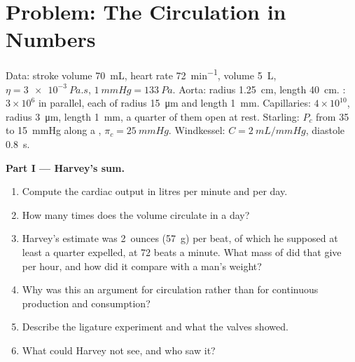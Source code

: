 \section{Problem: The Circulation in Numbers}

\begin{problem}
\label{pb:b2:blood-circulation:1}
Data: stroke volume \qty{70}{mL}, heart rate \qty{72}{min^{-1}},
 volume \qty{5}{L}, $\eta = \qty{3e-3}{Pa.s}$, $\qty{1}{mmHg} =
\qty{133}{Pa}$. Aorta: radius \qty{1.25}{cm}, length \qty{40}{cm}.
: $3\times 10^{6}$ in parallel, each of radius
\qty{15}{\micro m} and length \qty{1}{mm}. Capillaries: $4\times
10^{10}$, radius \qty{3}{\micro m}, length \qty{1}{mm}, a quarter of
them open at rest. Starling: $P_c$ from 35 to \qty{15}{mmHg} along a
, $\pi_c = \qty{25}{mmHg}$. Windkessel: $C =
\qty{2}{mL/mmHg}$, diastole \qty{0.8}{s}.

\medskip
\noindent\textbf{Part I --- Harvey's sum.}
\begin{enumerate}
  \item Compute the cardiac output in litres per minute and per day.
  \item How many times does the  volume circulate in a day?
  \item Harvey's estimate was 2~ounces (\qty{57}{g}) per beat,
        of which he supposed at least a quarter expelled, at 72 beats
        a minute. What mass of  did that give per hour, and how
        did it compare with a man's weight?
  \item Why was this an argument for circulation rather than for
        continuous production and consumption?
  \item Describe the ligature experiment and what the valves showed.
  \item What could Harvey not see, and who saw it?
\end{enumerate}


\end{problem}

